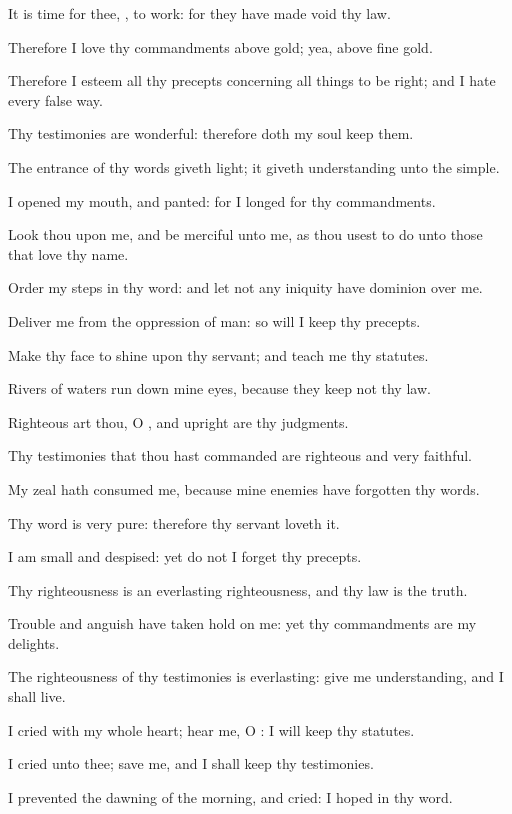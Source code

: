 \verse It is time for thee, \LORD, to work: for they have made void thy law.

\verse Therefore I love thy commandments above gold; yea, above fine gold.

\verse Therefore I esteem all thy precepts concerning all things to be right; and I hate every false way.

\verse Thy testimonies are wonderful: therefore doth my soul keep them.

\verse The entrance of thy words giveth light; it giveth understanding unto the simple.

\verse I opened my mouth, and panted: for I longed for thy commandments.

\verse Look thou upon me, and be merciful unto me, as thou usest to do unto those that love thy name.

\verse Order my steps in thy word: and let not any iniquity have dominion over me.

\verse Deliver me from the oppression of man: so will I keep thy precepts.

\verse Make thy face to shine upon thy servant; and teach me thy statutes.

\verse Rivers of waters run down mine eyes, because they keep not thy law.

\verse Righteous art thou, O \LORD, and upright are thy judgments.

\verse Thy testimonies that thou hast commanded are righteous and very faithful.

\verse My zeal hath consumed me, because mine enemies have forgotten thy words.

\verse Thy word is very pure: therefore thy servant loveth it.

\verse I am small and despised: yet do not I forget thy precepts.

\verse Thy righteousness is an everlasting righteousness, and thy law is the truth.

\verse Trouble and anguish have taken hold on me: yet thy commandments are my delights.

\verse The righteousness of thy testimonies is everlasting: give me understanding, and I shall live.

\verse I cried with my whole heart; hear me, O \LORD: I will keep thy statutes.

\verse I cried unto thee; save me, and I shall keep thy testimonies.

\verse I prevented the dawning of the morning, and cried: I hoped in thy word.

